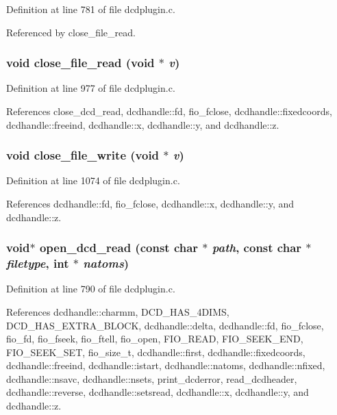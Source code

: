 Definition at line 781 of file dcdplugin.c.

Referenced by close\_\-file\_\-read.
\subsubsection{\setlength{\rightskip}{0pt plus 5cm}void close\_\-file\_\-read (void $\ast$ {\em v})\hspace{0.3cm}{\tt  [static]}}\label{dcdplugin_8c_a37}




Definition at line 977 of file dcdplugin.c.

References close\_\-dcd\_\-read, dcdhandle::fd, fio\_\-fclose, dcdhandle::fixedcoords, dcdhandle::freeind, dcdhandle::x, dcdhandle::y, and dcdhandle::z.
\subsubsection{\setlength{\rightskip}{0pt plus 5cm}void close\_\-file\_\-write (void $\ast$ {\em v})\hspace{0.3cm}{\tt  [static]}}\label{dcdplugin_8c_a40}




Definition at line 1074 of file dcdplugin.c.

References dcdhandle::fd, fio\_\-fclose, dcdhandle::x, dcdhandle::y, and dcdhandle::z.
\subsubsection{\setlength{\rightskip}{0pt plus 5cm}void$\ast$ open\_\-dcd\_\-read (const char $\ast$ {\em path}, const char $\ast$ {\em filetype}, int $\ast$ {\em natoms})\hspace{0.3cm}{\tt  [static]}}\label{dcdplugin_8c_a35}




Definition at line 790 of file dcdplugin.c.

References dcdhandle::charmm, DCD\_\-HAS\_\-4DIMS, DCD\_\-HAS\_\-EXTRA\_\-BLOCK, dcdhandle::delta, dcdhandle::fd, fio\_\-fclose, fio\_\-fd, fio\_\-fseek, fio\_\-ftell, fio\_\-open, FIO\_\-READ, FIO\_\-SEEK\_\-END, FIO\_\-SEEK\_\-SET, fio\_\-size\_\-t, dcdhandle::first, dcdhandle::fixedcoords, dcdhandle::freeind, dcdhandle::istart, dcdhandle::natoms, dcdhandle::nfixed, dcdhandle::nsavc, dcdhandle::nsets, print\_\-dcderror, read\_\-dcdheader, dcdhandle::reverse, dcdhandle::setsread, dcdhandle::x, dcdhandle::y, and dcdhandle::z.
